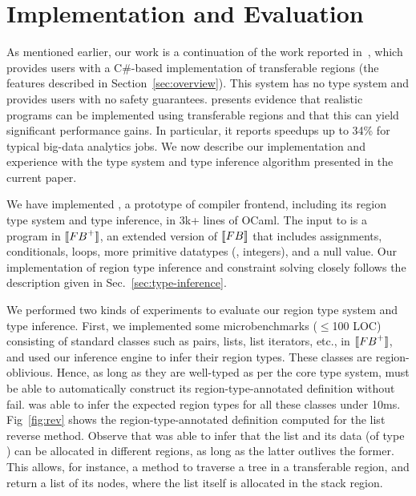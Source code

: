 \section{Implementation and Evaluation}
\label{sec:implementation}


As mentioned earlier, our work is a continuation of the work reported in~\cite{Broom:HotOS},
which provides users with a C\#-based implementation of transferable regions (the features
described in Section~\ref{sec:overview}). This system has no type system and provides users
with no safety guarantees. \cite{Broom:HotOS} presents evidence that realistic programs can
be implemented using transferable regions and that this can yield significant performance gains.
In particular, it reports speedups up to 34\% for typical big-data analytics jobs.
We now describe our implementation and experience with the type system and type inference
algorithm presented in the current paper.

We have implemented \namec, a prototype of \name compiler frontend,
including its region type system and type inference, in 3k+ lines of
OCaml.
The input to \namec is a program in $\llbracket {\sc FB}^+ \rrbracket$, an extended version of $\llbracket {\sc FB} \rrbracket$ that
includes assignments, conditionals, loops, more primitive datatypes
(\eg, integers), and a null value. 
Our implementation of region type inference and constraint solving
closely follows the description given in
Sec.~\ref{sec:type-inference}.


We performed two kinds of experiments to evaluate our region type system and type
inference.
First, we implemented some 
microbenchmarks ($\le$100 LOC) consisting of standard classes such
as pairs, lists, list iterators, etc., in $\llbracket {\sc FB}^+ \rrbracket$, and used
our inference engine to infer their region types.
These classes are region-oblivious. Hence, as long as they are well-typed
as per the core type system, \namec must be able to automatically construct its
region-type-annotated definition without fail. \namec was
able to infer the expected region types for all these classes under 10ms.
Fig~\ref{fig:rev} shows the region-type-annotated
definition computed for the list reverse method. Observe that \namec
was able to infer that the list and its data (of type ) can be
allocated in different regions, as long as the latter outlives the
former. This allows, for instance, a  method to traverse a
tree in a transferable region, and return a list of its nodes, where
the list itself is allocated in the stack region. 

